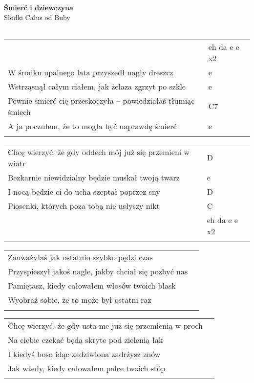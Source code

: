 \documentclass[a5paper]{article}
\begin{document}


\noindent
\fontsize{12pt}{15pt}\selectfont
\textbf{Śmierć i dziewczyna} \\
\fontsize{8pt}{10pt}\selectfont
Słodki Całus od Buby \\ \\
\fontsize{10pt}{12pt}\selectfont
{}
\begin{tabular}{@{}p{9.80cm}p{3cm}@{}}
\noindent
& eh da e e x2 \\
W środku upalnego lata przyszedł nagły dreszcz & e \\
Wstrząsnął całym ciałem, jak żelaza zgrzyt po szkle	& e \\
Pewnie śmierć cię przeskoczyła – powiedziałaś tłumiąc śmiech & C7 \\
A ja poczułem, że to mogła być naprawdę śmierć & e \\ \\
\end{tabular}

\noindent
\begin{tabular}{@{}p{8.80cm}p{3cm}@{}}
Chcę wierzyć, że gdy oddech mój już się przemieni w wiatr & D \\
Bezkarnie niewidzialny będzie muskał twoją twarz & e \\
I nocą będzie ci do ucha szeptał poprzez sny & D \\
Piosenki, których poza tobą nie usłyszy nikt & C \\
											& eh da e e x2 \\ \\
\end{tabular}

\noindent
\begin{tabular}{@{}p{8.80cm}p{3cm}@{}}
Zauważyłaś jak ostatnio szybko pędzi czas \\
Przyspieszył jakoś nagle, jakby chciał się pozbyć nas\\
Pamiętasz, kiedy całowałem włosów twoich blask\\
Wyobraź sobie, że to może był ostatni raz\\ \\
\end{tabular}

\noindent
\begin{tabular}{@{}p{8.80cm}p{3cm}@{}}
Chcę wierzyć, że gdy usta me już się przemienią w proch \\
Na ciebie czekać będą skryte pod zielenią łąk\\
I kiedyś boso idąc zadziwiona zadrżysz znów\\
Jak wtedy, kiedy całowałem palce twoich stóp\\\\
\end{tabular}
\end{document}
